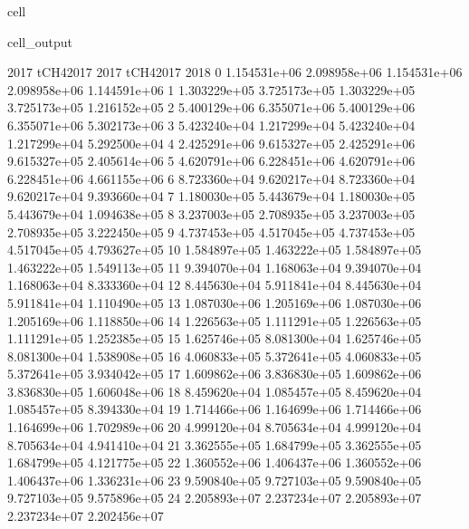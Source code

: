 \documentclass[letterpaper,10pt,english]{jupyterBook}
\begin{document}
\begin{sphinxuseclass}{cell}
\begin{sphinxVerbatimOutput}
\begin{sphinxuseclass}{cell_output}
\begin{sphinxVerbatim}[commandchars=\\\{\}]
            2017     tCH4\PYGZus{}2017          2017     tCH4\PYGZus{}2017          2018  \PYGZbs{}
0   1.154531e+06  2.098958e+06  1.154531e+06  2.098958e+06  1.144591e+06   
1   1.303229e+05  3.725173e+05  1.303229e+05  3.725173e+05  1.216152e+05   
2   5.400129e+06  6.355071e+06  5.400129e+06  6.355071e+06  5.302173e+06   
3   5.423240e+04  1.217299e+04  5.423240e+04  1.217299e+04  5.292500e+04   
4   2.425291e+06  9.615327e+05  2.425291e+06  9.615327e+05  2.405614e+06   
5   4.620791e+06  6.228451e+06  4.620791e+06  6.228451e+06  4.661155e+06   
6   8.723360e+04  9.620217e+04  8.723360e+04  9.620217e+04  9.393660e+04   
7   1.180030e+05  5.443679e+04  1.180030e+05  5.443679e+04  1.094638e+05   
8   3.237003e+05  2.708935e+05  3.237003e+05  2.708935e+05  3.222450e+05   
9   4.737453e+05  4.517045e+05  4.737453e+05  4.517045e+05  4.793627e+05   
10  1.584897e+05  1.463222e+05  1.584897e+05  1.463222e+05  1.549113e+05   
11  9.394070e+04  1.168063e+04  9.394070e+04  1.168063e+04  8.333360e+04   
12  8.445630e+04  5.911841e+04  8.445630e+04  5.911841e+04  1.110490e+05   
13  1.087030e+06  1.205169e+06  1.087030e+06  1.205169e+06  1.118850e+06   
14  1.226563e+05  1.111291e+05  1.226563e+05  1.111291e+05  1.252385e+05   
15  1.625746e+05  8.081300e+04  1.625746e+05  8.081300e+04  1.538908e+05   
16  4.060833e+05  5.372641e+05  4.060833e+05  5.372641e+05  3.934042e+05   
17  1.609862e+06  3.836830e+05  1.609862e+06  3.836830e+05  1.606048e+06   
18  8.459620e+04  1.085457e+05  8.459620e+04  1.085457e+05  8.394330e+04   
19  1.714466e+06  1.164699e+06  1.714466e+06  1.164699e+06  1.702989e+06   
20  4.999120e+04  8.705634e+04  4.999120e+04  8.705634e+04  4.941410e+04   
21  3.362555e+05  1.684799e+05  3.362555e+05  1.684799e+05  4.121775e+05   
22  1.360552e+06  1.406437e+06  1.360552e+06  1.406437e+06  1.336231e+06   
23  9.590840e+05  9.727103e+05  9.590840e+05  9.727103e+05  9.575896e+05   
24  2.205893e+07  2.237234e+07  2.205893e+07  2.237234e+07  2.202456e+07   


\end{sphinxVerbatim}
\end{sphinxuseclass}
\end{sphinxVerbatimOutput}
\end{sphinxuseclass}
\end{document}
